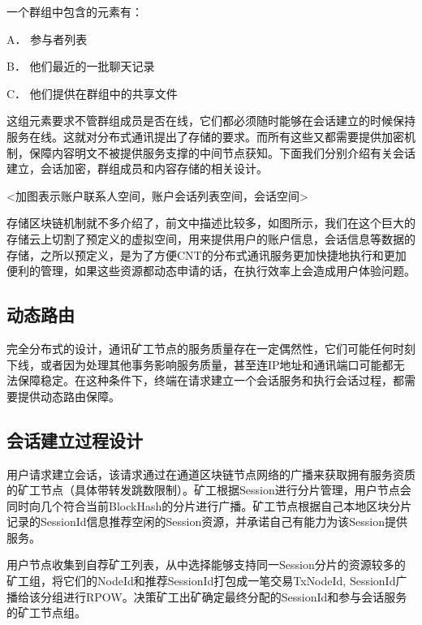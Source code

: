 \documentclass[a4paper,12pt]{article}
\begin{document}
        一个群组中包含的元素有：

A．	参与者列表

B．	他们最近的一批聊天记录

C．	他们提供在群组中的共享文件

这组元素要求不管群组成员是否在线，它们都必须随时能够在会话建立的时候保持服务在线。这就对分布式通讯提出了存储的要求。而所有这些又都需要提供加密机制，保障内容明文不被提供服务支撑的中间节点获知。下面我们分别介绍有关会话建立，会话加密，群组成员和内容存储的相关设计。

<加图表示账户联系人空间，账户会话列表空间，会话空间>

存储区块链机制就不多介绍了，前文中描述比较多，如图所示，我们在这个巨大的存储云上切割了预定义的虚拟空间，用来提供用户的账户信息，会话信息等数据的存储，之所以预定义，是为了方便CNT的分布式通讯服务更加快捷地执行和更加便利的管理，如果这些资源都动态申请的话，在执行效率上会造成用户体验问题。
\subsection{动态路由}

	完全分布式的设计，通讯矿工节点的服务质量存在一定偶然性，它们可能任何时刻下线，或者因为处理其他事务影响服务质量，甚至连IP地址和通讯端口可能都无法保障稳定。在这种条件下，终端在请求建立一个会话服务和执行会话过程，都需要提供动态路由保障。



\subsection{会话建立过程设计}


        用户请求建立会话，该请求通过在通道区块链节点网络的广播来获取拥有服务资质的矿工节点（具体带转发跳数限制）。矿工根据Session进行分片管理，用户节点会同时向几个符合当前BlockHash的分片进行广播。矿工节点根据自己本地区块分片记录的SessionId信息推荐空闲的Session资源，并承诺自己有能力为该Session提供服务。

        用户节点收集到自荐矿工列表，从中选择能够支持同一Session分片的资源较多的矿工组，将它们的NodeId和推荐SessionId打包成一笔交易Tx{{NodeId, SessionId}}广播给该分组进行RPOW。决策矿工出矿确定最终分配的SessionId和参与会话服务的矿工节点组。
\end{document}
